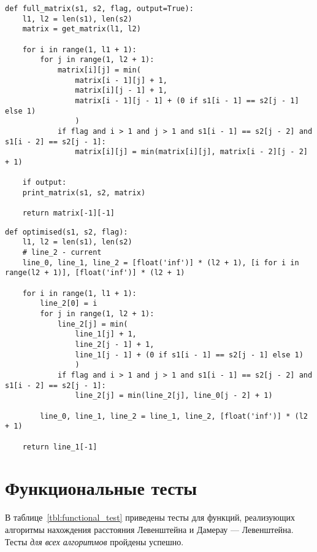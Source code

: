 \begin{center}
	\captionsetup{justification=raggedright,singlelinecheck=off}
	\begin{lstlisting}[label=lst:matr,caption=Алгоритм нахождения расстояния Дамерау--Левенштейна (матричный)]
def full_matrix(s1, s2, flag, output=True):
	l1, l2 = len(s1), len(s2)
	matrix = get_matrix(l1, l2)
	
	for i in range(1, l1 + 1):
		for j in range(1, l2 + 1):
			matrix[i][j] = min(
				matrix[i - 1][j] + 1,
				matrix[i][j - 1] + 1,
				matrix[i - 1][j - 1] + (0 if s1[i - 1] == s2[j - 1] else 1)
				)
			if flag and i > 1 and j > 1 and s1[i - 1] == s2[j - 2] and s1[i - 2] == s2[j - 1]:
				matrix[i][j] = min(matrix[i][j], matrix[i - 2][j - 2] + 1)
	
	if output:
	print_matrix(s1, s2, matrix)
	
	return matrix[-1][-1]
	\end{lstlisting}
\end{center}

\begin{center}
	\captionsetup{justification=raggedright,singlelinecheck=off}
	\begin{lstlisting}[label=lst:opt_matr,caption=Алгоритм нахождения расстояния Дамерау--Левенштейна (оптимизированный матричный)]
def optimised(s1, s2, flag):
	l1, l2 = len(s1), len(s2)
	# line_2 - current
	line_0, line_1, line_2 = [float('inf')] * (l2 + 1), [i for i in range(l2 + 1)], [float('inf')] * (l2 + 1)
	
	for i in range(1, l1 + 1):
		line_2[0] = i
		for j in range(1, l2 + 1):
			line_2[j] = min(
				line_1[j] + 1,
				line_2[j - 1] + 1,
				line_1[j - 1] + (0 if s1[i - 1] == s2[j - 1] else 1)
				)
			if flag and i > 1 and j > 1 and s1[i - 1] == s2[j - 2] and s1[i - 2] == s2[j - 1]:
				line_2[j] = min(line_2[j], line_0[j - 2] + 1)
		
		line_0, line_1, line_2 = line_1, line_2, [float('inf')] * (l2 + 1)
	
	return line_1[-1]
	\end{lstlisting}
\end{center}

\section{Функциональные тесты}

В таблице~\ref{tbl:functional_test} приведены тесты для функций, реализующих алгоритмы нахождения расстояния Левенштейна и Дамерау --- Левенштейна. Тесты \textit{для всех алгоритмов} пройдены успешно.

